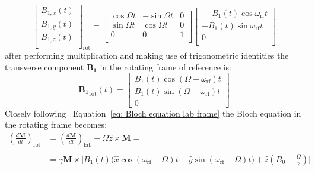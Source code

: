 \begin{equation}\label{eq: External B field rotating frame}
\begin{bmatrix}
    B_{1,x}(t)\\
    B_{1,y}(t)\\
    B_{1,z}(t)\\
\end{bmatrix}_{\mathrm{rot}} = 
	\begin{bmatrix}
    \cos{\Omega t} & -\sin{\Omega t} & 0\\
    \sin{\Omega t} & \cos{\Omega t} & 0\\
    0 & 0 & 1\\
	\end{bmatrix}
	\begin{bmatrix}
    \phantom{-}B_{1}(t)\cos{\omega_{\text{rf}} t}\\
    -B_{1}(t)\sin{\omega_{\text{rf}} t}\\
    0\\
	\end{bmatrix}
\end{equation}
after performing multiplication and making use of trigonometric identities the transverse component $\mathbf{B_{1}}$ in the rotating frame of reference is:
\begin{equation}\label{eq: External B field rotating frame 2}
	\mathbf{B_{1}}_{\mathrm{rot}}(t)=
	\begin{bmatrix}
	B_{1}(t) \cos(\Omega -\omega_{\text{rf}})t\\
	B_{1}(t) \sin(\Omega -\omega_{\text{rf}})t\\
	0	
	\end{bmatrix}
\end{equation}
Closely following~\cite{Slichter1990, RNDT24} Equation~\ref{eq: Bloch equation lab frame} the Bloch equation in the rotating frame becomes: 
\begin{equation}\label{eq: Bloch equation rot}
\begin{split}
	\left(\frac{d\mathbf{M}}{dt}\right)_{\text{rot}} &=\left(\frac{d\mathbf{M}}{dt}\right)_{\text{lab}} + \Omega \hat{z} \times \mathbf{M} =\\ \\
	&= \gamma\mathbf{M}\times\biggl[B_1(t)(\hat{x}\cos{(\omega_{\text{rf}}-\Omega)}t-\hat{y}\sin{(\omega_{\text{rf}}-\Omega)t)}+
		 \hat{z}\left(B_0-\frac{\Omega}{\gamma}\right)\biggr]
\end{split}	
\end{equation}\\ \\
